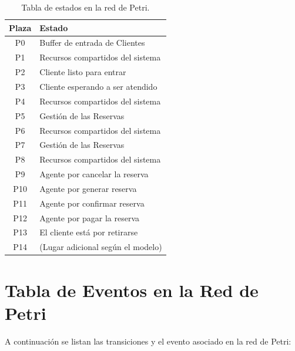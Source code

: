 \documentclass[12pt]{article}
\begin{document}
\begin{table}[H]
    \centering
    \renewcommand{\arraystretch}{1.2}
    \begin{tabularx}{\textwidth}{|c|X|}
    \hline
    \rowcolor{gray!20}
    \textbf{Plaza} & \textbf{Estado} \\ \hline
    P0  & Buffer de entrada de Clientes               \\ \hline
    P1  & Recursos compartidos del sistema            \\ \hline
    P2  & Cliente listo para entrar                   \\ \hline
    P3  & Cliente esperando a ser atendido            \\ \hline
    P4  & Recursos compartidos del sistema            \\ \hline
    P5  & Gestión de las Reservas                     \\ \hline
    P6  & Recursos compartidos del sistema            \\ \hline
    P7  & Gestión de las Reservas                     \\ \hline
    P8  & Recursos compartidos del sistema            \\ \hline
    P9  & Agente por cancelar la reserva              \\ \hline
    P10 & Agente por generar reserva                  \\ \hline
    P11 & Agente por confirmar reserva                \\ \hline
    P12 & Agente por pagar la reserva                 \\ \hline
    P13 & El cliente está por retirarse               \\ \hline
    P14 & (Lugar adicional según el modelo)           \\ \hline
    \end{tabularx}
    \caption{Tabla de estados en la red de Petri.}
    \label{tabla:estados-red-petri}
\end{table}

\newpage

\section{Tabla de Eventos en la Red de Petri}
A continuación se listan las transiciones y el evento asociado en la red de Petri:
\end{document}
